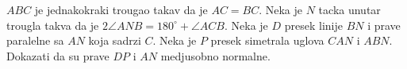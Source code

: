 \problem
$ABC$ je jednakokraki trougao takav da je $AC = BC$.
Neka je $N$ tacka unutar trougla takva da je $2 \angle ANB = 180^\circ + \angle{ACB}$.
Neka je $D$ presek linije $BN$ i prave paralelne sa $AN$ koja sadrzi $C$.
Neka je $P$ presek simetrala uglova $CAN$ i $ABN$.
Dokazati da su prave $DP$ i $AN$ medjusobno normalne.
\solution
\endproblem
